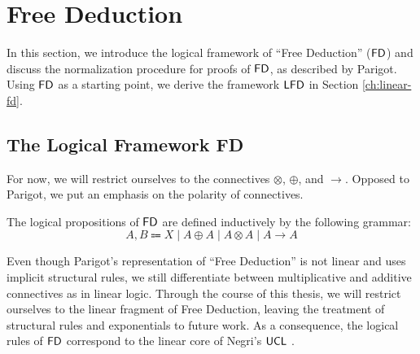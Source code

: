 \chapter{Free Deduction}\label{ch:free-deduction}

In this section, we introduce the logical framework of \enquote{Free Deduction} ($\FD$)
and discuss the normalization procedure for proofs of $\FD$, as described by Parigot.
Using $\FD$ as a starting point, we derive the framework $\textsf{LFD}$ in Section \ref{ch:linear-fd}.

\section{The Logical Framework FD}
For now, we will restrict ourselves to the connectives $\otimes$, $\oplus$, and $\to$.
Opposed to Parigot, we put an emphasis on
the polarity \cite{Andreoli1992:FocusingProofs, Zeilberger2008:UnityOfDuality} of connectives.

\begin{definition}[Propositions of $\FD$]
  The logical propositions of $\FD$ are defined inductively by the following grammar:
  \[
    A, B \Coloneqq X
              \mid A \oplus A
              \mid A \otimes A
              \mid A \to A
  \]
\end{definition}

Even though Parigot's representation of \enquote{Free Deduction} is not linear
and uses implicit structural rules, we still differentiate between multiplicative
and additive connectives as in linear logic. Through the course of this thesis,
we will restrict ourselves to the linear fragment of Free Deduction, leaving
the treatment of structural rules and exponentials to future work. As a consequence,
the logical rules of $\FD$ correspond to the linear core of Negri's $\textsf{UCL}$ \cite{Negri2002:varieties-of-linear-calculi}.

